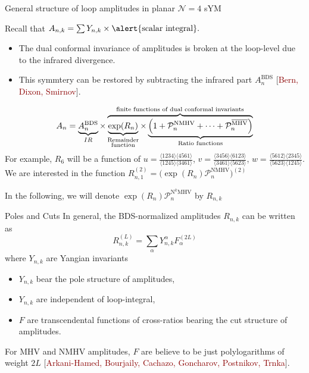 \documentclass[10pt]{beamer}
\begin{document}
\begin{frame}{General structure of loop amplitudes in planar $\mathcal{N}=4$ sYM}

Recall that $A_{n,k}=\sum Y_{n,k}\times \alert{\text{scalar integral}  }.$
   \begin{itemize}
       \item The dual conformal invariance of amplitudes is broken at the loop-level due to the infrared divergence.
       \item This symmtery can be restored by subtracting the infrared part $A_{n}^{\text{BDS}}$ {\footnotesize[\textcolor{darkred}{Bern, Dixon, Smirnov}]}.
   \end{itemize}
\begin{equation*}
    A_{n}= \underbrace{A_{n}^{\text{BDS}}}_{IR}\times \overbrace{\underbrace{\exp (R_{n})}_{\substack{\text{Remainder}\\ \text{function}}}
    \times \underbrace{\Bigl(1+ \mathcal{P}_{n}^{\text{NMHV}}+\cdots+\mathcal{P}_{n}^{\overline{\text{MHV}}} \Bigr)}_{\text{Ratio functions}}}^{\text{finite functions of dual conformal invariants}}
\end{equation*}
For example, $R_{6}$ will be a function of $u=\frac{\langle 1234\rangle\langle 4561\rangle}{\langle 1245\rangle\langle 3461\rangle}$, $v=\frac{\langle 3456\rangle\langle 6123\rangle}{\langle 3461\rangle\langle 5623\rangle}$, $w=\frac{\langle 5612 \rangle\langle 2345\rangle}{\langle 5623\rangle\langle 1245\rangle}.$
\\
We are interested in the function $R_{n,1}^{(2)}=\bigl(\exp(R_{n})\mathcal{P}_{n}^{\text{NMHV}}\bigr)^{(2)}$ 

\textcolor{hblue}{\footnotesize{In the following, we will denote $\exp(R_{n})\mathcal{P}_{n}^{\text{N}^{k}\text{MHV}}$ by $R_{n,k}$}}
\end{frame}



\begin{frame}{Poles and Cuts}
  In general, the BDS-normalized amplitudes $R_{n,k}$ can be written as 
 \begin{equation*}
   R_{n,k}^{(L)} =\sum_{\alpha} Y_{n,k}^{\alpha}F_{\alpha}^{(2L)} 
 \end{equation*}
 where $Y_{n,k}$ are Yangian invariants %
 \begin{itemize}
   \item $Y_{n,k}$ bear the pole structure of amplitudes,
   \item $Y_{n,k}$ are \alert{independent of loop-integral},
   \item $F$ are transcendental functions of cross-ratios bearing the cut structure of amplitudes.
 \end{itemize} 
For MHV and NMHV amplitudes, $F$ are believe to be just polylogarithms of weight $2L$  {\footnotesize[\textcolor{darkred}{Arkani-Hamed, Bourjaily, Cachazo, Goncharov, Postnikov, Trnka}]}.
 \end{frame}
\end{document}
